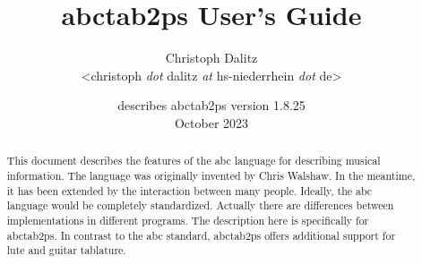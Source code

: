 \documentclass[a4paper]{article}
\begin{document}
\title{\vspace*{-8mm}
abctab2ps User's Guide}
\author{
Christoph Dalitz
\\\textless christoph {\it dot} dalitz {\it at} hs-niederrhein {\it dot} de\textgreater
}
\date{describes abctab2ps version 1.8.25\\[1.0ex]
October 2023}
\maketitle


\begin{abstract}
\noindent
This document describes the features of the abc language for describing
musical information. The language was originally invented by Chris Walshaw.
In the meantime, it has been extended by the interaction between
many people. Ideally, the abc language would be completely standardized.
Actually there are differences between implementations in different programs.
The description here is specifically for abctab2ps. In contrast to the
abc standard, abctab2ps offers additional support for lute and guitar
tablature.
\end{abstract}


\tableofcontents

\end{document}
